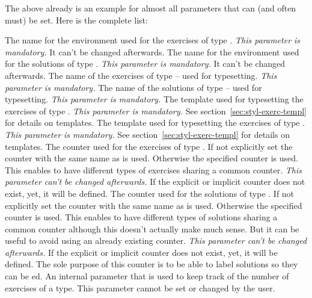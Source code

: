 \documentclass{xsim-manual}
\begin{document}
The above already is an example for almost all parameters that can (and often
must) be set.  Here is the complete list:
\begin{parameters}
    The name for the environment used for the exercises of type .
    \emph{This parameter is mandatory.} It can't be changed afterwards.
    The name for the environment used for the solutions of type .
    \emph{This parameter is mandatory.} It can't be changed afterwards.
    The name of the exercises of type  -- used for typesetting.
    \emph{This parameter is mandatory.}
    The name of the solutions of type  -- used for typesetting.
    \emph{This parameter is mandatory.}
    The template used for typesetting the exercises of type .
    \emph{This parameter is mandatory.} See
    section~\vref{sec:styl-exerc-templ} for details on templates.
    The template used for typesetting the exercises of type .
    \emph{This parameter is mandatory.} See
    section~\vref{sec:styl-exerc-templ} for details on templates.
    The counter used for the exercises of type .  If not explicitly
    set the counter with the same name as  is used.
    Otherwise the specified counter is used.  This enables to have different
    types of exercises sharing a common counter.  \emph{This parameter can't
      be changed afterwards.}  If the explicit or implicit counter does not
    exist, yet, it will be defined.
    The counter used for the solutions of type .  If not explicitly
    set the counter with the same name as  is used.
    Otherwise the specified counter is used.  This enables to have different
    types of solutions sharing a common counter although this doesn't actually
    make much sense.  But it can be useful to avoid using an already existing
    counter. \emph{This parameter can't be changed afterwards.}  If the
    explicit or implicit counter does not exist, yet, it will be defined.  The
    sole purpose of this counter is to be able to label solutions so they can
    be ed.
    An internal parameter that is used to keep track of the number of
    exercises of a type.  This parameter cannot be set or changed by the
    user.
\end{parameters}
\end{document}
